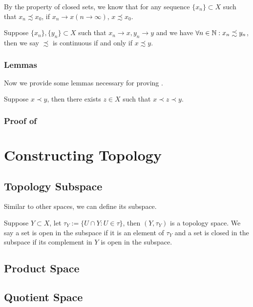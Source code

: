 By the property of closed sets, we know that for any sequence $\{x_n\} \subset X$ such that $x_n\precsim x_0$, if $x_n\to x(n\to \infty)$, $x\precsim x_0$.
\begin{proposition}
    Suppose $\{x_n\},\{y_n\}\subset X$ such that $x_n\to x, y_n \to y$ and we have $\forall n\in \mathbb{N}: x_n\precsim y_n$, then we say $\precsim$ is continuous if and only if $x\precsim y$.
\end{proposition}

\subsubsection{Lemmas}
Now we provide some lemmas necessary for proving .

\begin{lemma}[Denseness]
    Suppose $x\prec y$, then there exists $z\in X$ such that $x\prec z \prec y$.
\end{lemma}

\subsubsection{Proof of }
\section{Constructing Topology}
\subsection{Topology Subspace}
Similar to other spaces, we can define its subspace. 
\begin{definition}
    Suppose $Y\subset X$, let $\tau_Y := \{U\cap Y : U \in \tau\}$, then $(Y,\tau_Y)$ is a topology space. We say a set is open in the subspace if it is an element of $\tau_Y$ and a set is closed in the subspace if its complement in $Y$ is open in the subspace.
\end{definition}

\subsection{Product Space}

\subsection{Quotient Space}

